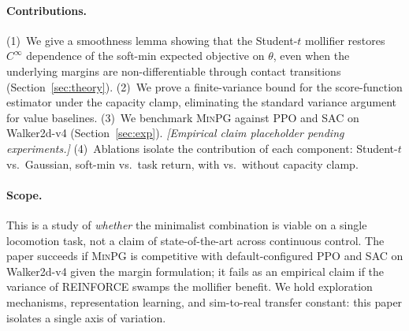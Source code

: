 \paragraph{Contributions.}
(1)~We give a smoothness lemma showing that the Student-$t$ mollifier
restores $C^\infty$ dependence of the soft-min expected objective on
$\theta$, even when the underlying margins are non-differentiable
through contact transitions (Section~\ref{sec:theory}).
(2)~We prove a finite-variance bound for the score-function estimator
under the capacity clamp, eliminating the standard variance argument
for value baselines.
(3)~We benchmark \textsc{MinPG} against PPO and SAC on Walker2d-v4
(Section~\ref{sec:exp}). \emph{[Empirical claim placeholder pending
experiments.]}
(4)~Ablations isolate the contribution of each component:
Student-$t$ vs.\ Gaussian, soft-min vs.\ task return, with vs.\
without capacity clamp.

\paragraph{Scope.}
This is a study of \emph{whether} the minimalist combination is
viable on a single locomotion task, not a claim of state-of-the-art
across continuous control. The paper succeeds if \textsc{MinPG} is
competitive with default-configured PPO and SAC on Walker2d-v4 given
the margin formulation; it fails as an empirical claim if the
variance of REINFORCE swamps the mollifier benefit. We hold
exploration mechanisms, representation learning, and sim-to-real
transfer constant: this paper isolates a single axis of variation.
